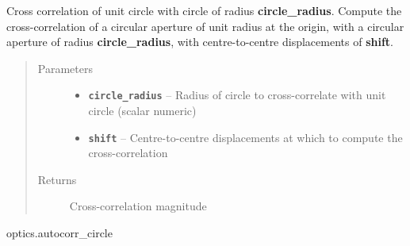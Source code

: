 \documentclass[a4paper,10pt,english]{sphinxmanual}
\begin{document}
\begin{fulllineitems}
\label{packages:optics.crosscorr_circle}
Cross correlation of unit circle with circle of radius \textbf{circle\_radius}.
Compute the cross-correlation of a circular aperture of unit radius at the origin,
with a circular aperture of radius \textbf{circle\_radius}, with centre-to-centre displacements of \textbf{shift}.
\begin{quote}\begin{description}
\item[{Parameters}] \leavevmode\begin{itemize}
\item {} 
\textbf{\texttt{circle\_radius}} -- Radius of circle to cross-correlate with unit circle (scalar numeric)

\item {} 
\textbf{\texttt{shift}} -- Centre-to-centre displacements at which to compute the cross-correlation

\end{itemize}

\item[{Returns}] \leavevmode
Cross-correlation magnitude

\end{description}\end{quote}




optics.autocorr\_circle



\end{fulllineitems}

\end{document}
